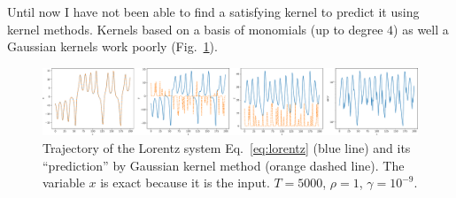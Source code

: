 \documentclass{article}
\begin{document}
Until now I have not been able to find a satisfying kernel to predict it using kernel methods. 
Kernels based on a basis of monomials (up to degree $4$) as well a Gaussian kernels work poorly (Fig.~\ref{fig:kernel_lorentz_1}).
\begin{figure}
 \centering
 \includegraphics[width=\textwidth]{figs/kernel_lorentz_1}
 \caption{Trajectory of the Lorentz system Eq.~\eqref{eq:lorentz} (blue line) and its ``prediction'' by Gaussian kernel method (orange dashed line).
 The variable $x$ is exact because it is the input. 
 $T=5000$, $\rho=1$, $\gamma=10^{-9}$.}
 \label{fig:kernel_lorentz_1}
\end{figure}






\end{document}
